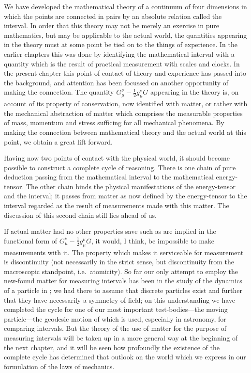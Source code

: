 \documentclass[12pt]{book}
\begin{document}

We have developed the mathematical theory of a continuum of four
dimensions in which the points are connected in pairs by an absolute relation
called the interval. In order that this theory may not be merely an exercise
in pure mathematics, but may be applicable to the actual world, the quantities
appearing in the theory must at some point be tied on to the things of
experience. In the earlier chapters this was done by identifying the mathematical
interval with a quantity which is the result of practical measurement
with scales and clocks. In the present chapter this point of contact of theory
and experience has passed into the background, and attention has been
focussed on another opportunity of making the connection. The quantity
$G_{\mu}^{\nu} - \frac{1}{2} g_{\mu}^{\nu}G$ appearing in the theory is, on account of its property of conservation,
now identified with matter, or rather with the mechanical abstraction
%
of matter which comprises the measurable properties of mass, momentum and
stress sufficing for all mechanical phenomena. By making the connection
between mathematical theory and the actual world at this point, we obtain a
great lift forward.

Having now two points of contact with the physical world, it should
become possible to construct a complete cycle of reasoning. There is one
chain of pure deduction passing from the mathematical interval to the mathematical
energy-tensor. The other chain binds the physical manifestations of
the energy-tensor and the interval; it passes from matter as now defined by
the energy-tensor to the interval regarded as the result of measurements made
with this matter. The discussion of this second chain still lies ahead of us.

If actual matter had no other properties save such as are implied in the
functional form of $G_{\mu}^{\nu} - \frac{1}{2} g_{\mu}^{\nu}G$, it would, I think, be impossible to make measurements
with it. The property which makes it serviceable for measurement is
discontinuity (not necessarily in the strict sense, but discontinuity from the
macroscopic standpoint, i.e.\ atomicity). So far our only attempt to employ
%
the new-found matter for measuring intervals has been in the study of the
dynamics of a particle in ; we had there to assume that discrete particles
exist and further that they have necessarily a symmetry of field; on this
understanding we have completed the cycle for one of our most important
test-bodies---the moving particle---the geodesic motion of which is used, especially
in astronomy, for comparing intervals. But the theory of the use of
matter for the purpose of measuring intervals will be taken up in a more
general way at the beginning of the next chapter, and it will be seen how
profoundly the existence of the complete cycle has determined that outlook
on the world which we express in our formulation of the laws of mechanics.
\end{document}
